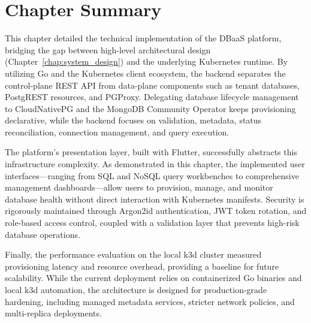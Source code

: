 \section*{Chapter Summary}
This chapter detailed the technical implementation of the DBaaS platform, bridging the gap between high-level architectural design (Chapter~\ref{chap:system_design}) and the underlying Kubernetes runtime. By utilizing Go and the Kubernetes client ecosystem, the backend separates the control-plane REST API from data-plane components such as tenant databases, PostgREST resources, and PGProxy. Delegating database lifecycle management to CloudNativePG and the MongoDB Community Operator keeps provisioning declarative, while the backend focuses on validation, metadata, status reconciliation, connection management, and query execution.

The platform's presentation layer, built with Flutter, successfully abstracts this infrastructure complexity. As demonstrated in this chapter, the implemented user interfaces—ranging from SQL and NoSQL query workbenches to comprehensive management dashboards—allow users to provision, manage, and monitor database health without direct interaction with Kubernetes manifests. Security is rigorously maintained through Argon2id authentication, JWT token rotation, and role-based access control, coupled with a validation layer that prevents high-risk database operations.

Finally, the performance evaluation on the local k3d cluster measured provisioning latency and resource overhead, providing a baseline for future scalability. While the current deployment relies on containerized Go binaries and local k3d automation, the architecture is designed for production-grade hardening, including managed metadata services, stricter network policies, and multi-replica deployments.
